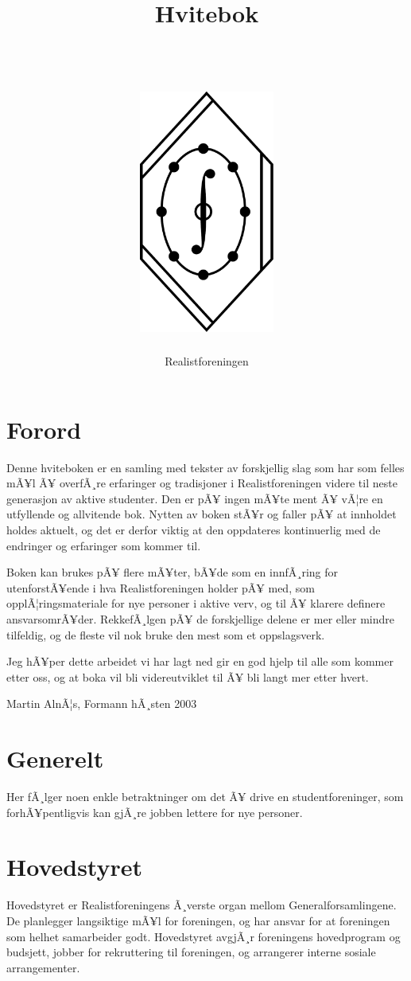 \documentclass[11pt,norsk,a4paper,pointlessnumbers]{scrbook}
\title{Hvitebok\\
       \quad \\
       \quad \\
       \includegraphics[height=8cm]{rflogo} }
\author{Realistforeningen}
\begin{document}
\frontmatter

\maketitle{}
\tableofcontents{}


\chapter{Forord}
Denne hviteboken er en samling med tekster av forskjellig slag som har
som felles mÃ¥l Ã¥ overfÃ¸re erfaringer og tradisjoner i Realistforeningen
videre til neste generasjon av aktive studenter. Den er pÃ¥ ingen mÃ¥te
ment Ã¥ vÃ¦re en utfyllende og allvitende bok. Nytten av boken stÃ¥r og
faller pÃ¥ at innholdet holdes aktuelt, og det er derfor viktig at den
oppdateres kontinuerlig med de endringer og erfaringer som kommer til.

Boken kan brukes pÃ¥ flere mÃ¥ter, bÃ¥de som en innfÃ¸ring for utenforstÃ¥ende
i hva Realistforeningen holder pÃ¥ med, som opplÃ¦ringsmateriale for nye
personer i aktive verv, og til Ã¥ klarere definere ansvarsomrÃ¥der.
RekkefÃ¸lgen pÃ¥ de forskjellige delene er mer eller mindre tilfeldig,
og de fleste vil nok bruke den mest som et oppslagsverk.

Jeg hÃ¥per dette arbeidet vi har lagt ned gir en god hjelp til alle
som kommer etter oss, og at boka vil bli videreutviklet til Ã¥ bli
langt mer etter hvert.

Martin AlnÃ¦s, Formann hÃ¸sten 2003


\mainmatter

\chapter{Generelt}
Her fÃ¸lger noen enkle betraktninger om det Ã¥ drive en studentforeninger,
som forhÃ¥pentligvis kan gjÃ¸re jobben lettere for nye personer.


\chapter{Hovedstyret}
Hovedstyret er Realistforeningens Ã¸verste organ mellom Generalforsamlingene.
De planlegger langsiktige mÃ¥l for foreningen, og har ansvar for at
foreningen som helhet samarbeider godt. Hovedstyret avgjÃ¸r foreningens
hovedprogram og budsjett, jobber for rekruttering til foreningen, og
arrangerer interne sosiale arrangementer.


\end{document}
